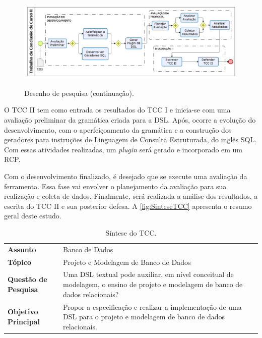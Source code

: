 \begin{figure}[!htb]
	\centering
	\caption{Desenho de pesquisa (continuação).}
		\includegraphics[width=1\textwidth]{img/DesenhoPesquisa2.png}
	\label{fig:ResearchDesign2}
\end{figure}

O \ac{TCC} II tem como entrada os resultados do \ac{TCC} I e inicia-se com uma avaliação preliminar da gramática criada para a \ac{DSL}. 
Após, ocorre a evolução do desenvolvimento, com o aperfeiçoamento da gramática e a construção dos geradores para instruções de Linguagem de Consulta Estruturada, do inglês \ac{SQL}. 
Com essas atividades realizadas, um \textit{plugin} será gerado e incorporado em um \ac{RCP}. 

Com o desenvolvimento finalizado, é desejado que se execute uma avaliação da ferramenta. 
Essa fase vai envolver o planejamento da avaliação para sua realização  e coleta de dados. 
Finalmente, será realizada a análise dos resultados, a escrita do \ac{TCC} II e sua posterior defesa. A \autoref{fig:SinteseTCC} apresenta o resumo geral deste estudo.


\begin{table}[!htb]
    \centering
    \caption{Síntese do TCC.}
    \begin{tabular}{m{4.5cm}|m{10cm}}
        \bottomrule
\textbf{Assunto} & Banco de Dados \\
\textbf{Tópico} &  Projeto e Modelagem de Banco de Dados\\
\textbf{Questão de Pesquisa} & Uma \ac{DSL} textual pode auxiliar, em nível conceitual de modelagem, o ensino de projeto e modelagem de banco de dados relacionais? \\
\textbf{Objetivo Principal} & Propor a especificação e realizar a implementação de uma \ac{DSL} para o projeto e modelagem de banco de dados relacionais. \\ 
        \toprule
    \end{tabular}
        \label{fig:SinteseTCC}
\end{table}

